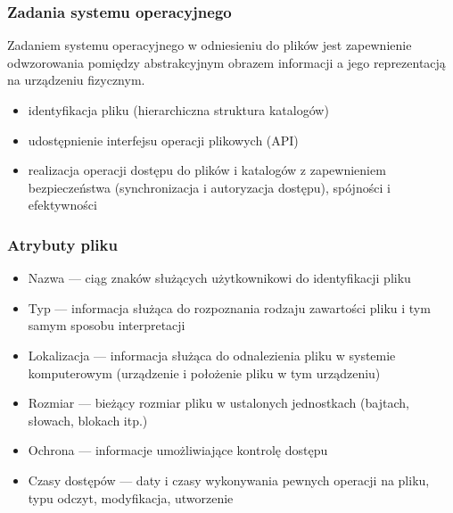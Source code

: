 \documentclass[main.tex]{subfiles}
\begin{document}
    \subsubsection{Zadania systemu operacyjnego}
    Zadaniem systemu operacyjnego w odniesieniu do plików jest zapewnienie odwzorowania pomiędzy abstrakcyjnym obrazem
    informacji a jego reprezentacją na urządzeniu fizycznym.
    \begin{itemize}
        \item identyfikacja pliku (hierarchiczna struktura katalogów)
        \item udostępnienie interfejsu operacji plikowych (API)
        \item realizacja operacji dostępu do plików i katalogów z zapewnieniem bezpieczeństwa (synchronizacja i autoryzacja dostępu),
        spójności i efektywności
    \end{itemize}

    \subsubsection{Atrybuty pliku}
    \begin{itemize}
        \item Nazwa — ciąg znaków służących użytkownikowi do identyfikacji pliku
        \item Typ — informacja służąca do rozpoznania rodzaju zawartości pliku i tym samym sposobu interpretacji
        \item Lokalizacja — informacja służąca do odnalezienia pliku w systemie komputerowym (urządzenie i położenie pliku w tym
        urządzeniu)
        \item Rozmiar — bieżący rozmiar pliku w ustalonych jednostkach (bajtach, słowach, blokach itp.)
        \item Ochrona — informacje umożliwiające kontrolę dostępu
        \item Czasy dostępów — daty i czasy wykonywania pewnych operacji na pliku, typu odczyt, modyfikacja, utworzenie
    \end{itemize}
\end{document}

